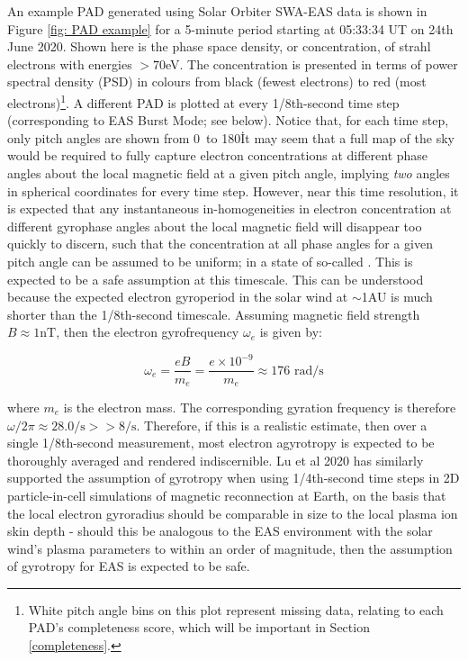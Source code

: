 An example PAD generated using Solar Orbiter SWA-EAS data is shown in Figure \ref{fig: PAD example} for a 5-minute period starting at 05:33:34 UT on 24th June 2020\cite{owen2021}. Shown here is the phase space density, or concentration, of strahl electrons with energies \(>70\)eV. The concentration is presented in terms of power spectral density (PSD) in colours from black (fewest electrons) to red (most electrons)\footnote{White pitch angle bins on this plot represent missing data, relating to each PAD's completeness score, which will be important in Section \ref{completeness}.}. A different PAD is plotted at every 1/8th-second time step (corresponding to EAS Burst Mode; see below). Notice that, for each time step, only pitch angles are shown from 0\degree\ to 180\degree\. It may seem that a full map of the sky would be required to fully capture electron concentrations at different phase angles about the local magnetic field at a given pitch angle, implying \textit{two} angles in spherical coordinates for every time step. However, near this time resolution, it is expected that any instantaneous in-homogeneities in electron concentration at different gyrophase angles about the local magnetic field will disappear too quickly to discern, such that the concentration at all phase angles for a given pitch angle can be assumed to be uniform; in a state of so-called \cite{owen2021}. This is expected to be a safe assumption at this timescale\cite{vocks2012}\cite{spinnangr2022}\cite{owen2021}. This can be understood because the expected electron gyroperiod in the solar wind at \(\sim\)1AU is much shorter than the 1/8th-second timescale. Assuming magnetic field strength \(B\approx1\textrm{nT}\), then the electron gyrofrequency \(\omega_{e}\) is given by:

\begin{equation} \label{eq: gyrofreq}
    \omega_{e}=\frac{eB}{m_{e}}=\frac{e\times10^{-9}}{m_{e}}\approx176\textrm{ rad/s}
\end{equation}

where \(m_{e}\) is the electron mass. The corresponding gyration frequency is therefore \(\omega/2\pi\approx28.0\textrm{/s}>>8\textrm{/s}\). Therefore, if this is a realistic estimate, then over a single 1/8th-second measurement, most electron agyrotropy is expected to be thoroughly averaged and rendered indiscernible. Lu et al 2020 has similarly supported the assumption of  gyrotropy when using 1/4th-second time steps in 2D particle-in-cell simulations of magnetic reconnection at Earth, on the basis that the local electron gyroradius should be comparable in size to the local plasma ion skin depth - should this be analogous to the EAS environment with the solar wind's plasma parameters to within an order of magnitude, then the assumption of gyrotropy for EAS is expected to be safe\cite{lu2020}\cite{lu2019}.
\\


